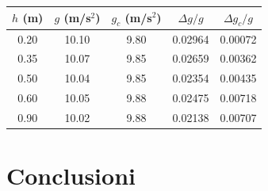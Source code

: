 \begin{center}
\begin{tabular}{c|c|c|c|c}
$h$ (m) & $g$ (m/s$^2$) & $g_c$ (m/s$^2$) & $\Delta g/g$ & $\Delta g_c/g$\\
\midrule
0.20 & 10.10 & 9.80 & 0.02964 & 0.00072 \\
0.35 & 10.07 & 9.85 & 0.02659 & 0.00362 \\
0.50 & 10.04 & 9.85 & 0.02354 & 0.00435 \\
0.60 & 10.05 & 9.88 & 0.02475 & 0.00718 \\
0.90 & 10.02 & 9.88 & 0.02138 & 0.00707 \\
\end{tabular}
\end{center}


\section{Conclusioni}